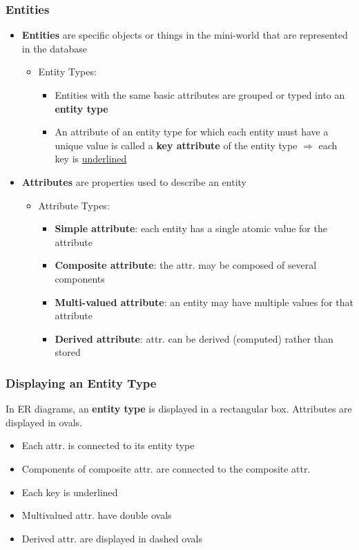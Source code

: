 \subsubsection{Entities} 
\begin{itemize}[label=\(\rhd\)]
    \item \textbf{Entities} are specific objects or things in the mini-world that are represented in the database 
    \begin{itemize}[label=\(\rhd\)]
        \item Entity Types:
        \begin{itemize}[label=\(\rhd\)]
            \item Entities with the same basic attributes are grouped or typed into an \textbf{entity type}
            \item An attribute of an entity type for which each entity must have a unique value is called a \textbf{key attribute} of the entity type $\Rightarrow$ each key is \underline{underlined} 
        \end{itemize}
    \end{itemize}
    \item \textbf{Attributes} are properties used to describe an entity
    \begin{itemize}[label=\(\rhd\)]
        \item Attribute Types:
        \begin{itemize}[label=\(\rhd\)]
            \item \textbf{Simple attribute}: each entity has a single atomic value for the attribute
            \item \textbf{Composite attribute}: the attr. may be composed of several components
            \item \textbf{Multi-valued attribute}: an entity may have multiple values for that attribute
            \item \textbf{Derived attribute}: attr. can be derived (computed) rather than stored
        \end{itemize}
    \end{itemize}
\end{itemize}

\subsubsection{Displaying an Entity Type}
In ER diagrams, an \textbf{entity type} is displayed in a rectangular box. Attributes are displayed in ovals.
\begin{itemize}[label=\(\rhd\)]
    \item Each attr. is connected to its entity type
    \item Components of composite attr. are connected to the composite attr.
    \item Each key is underlined
    \item Multivalued attr. have double ovals
    \item Derived attr. are displayed in dashed ovals
\end{itemize}

